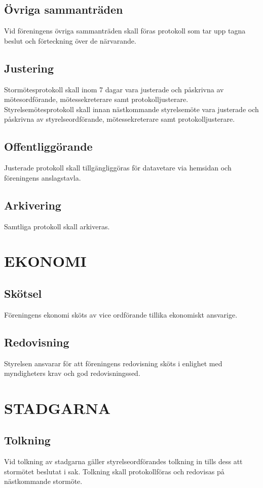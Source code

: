 \documentclass[a4paper]{article}
\begin{document}
{{  \subsection{Övriga sammanträden}
  Vid föreningens övriga sammanträden skall föras protokoll som tar upp tagna beslut och förteckning över de närvarande.
  \subsection{Justering}
  Stormötesprotokoll skall inom 7 dagar vara justerade och påskrivna av mötesordförande, mötessekreterare samt protokolljusterare.\\
  Styrelsemötesprotokoll skall innan nästkommande styrelsemöte vara justerade och påskrivna av styrelseordförande, mötessekreterare samt protokolljusterare.
  \subsection{Offentliggörande}
  Justerade protokoll skall tillgängliggöras för datavetare via hemsidan och föreningens anslagstavla.
  \subsection{Arkivering}
  Samtliga protokoll skall arkiveras.}
\section{EKONOMI}
{\subsection{Skötsel}
  Föreningens ekonomi sköts av vice ordförande tillika ekonomiskt ansvarige.
  \subsection{Redovisning}
  Styrelsen ansvarar för att föreningens redovisning sköts i enlighet med myndigheters krav och god redovisningssed.}
\section{STADGARNA}
{\subsection{Tolkning}
  Vid tolkning av stadgarna gäller styrelseordförandes tolkning in tills dess att stormötet beslutat i sak. Tolkning skall protokollföras och redovisas på nästkommande stormöte.
}}
\end{document}
